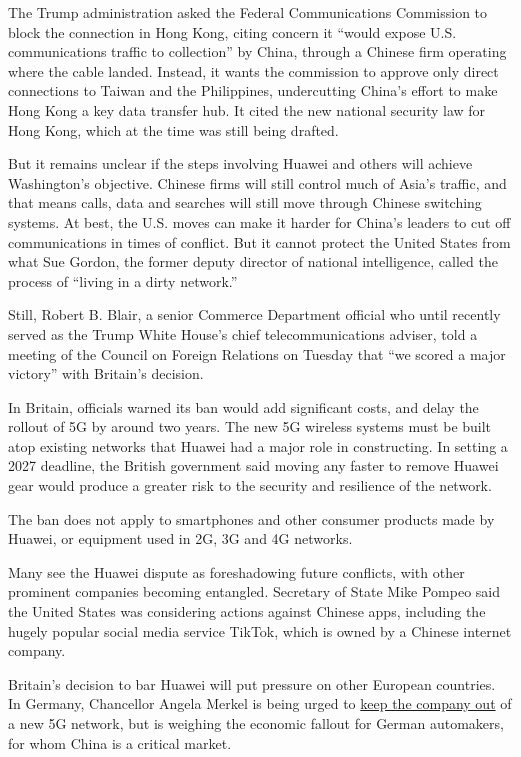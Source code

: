 The Trump administration asked the Federal Communications Commission to
block the connection in Hong Kong, citing concern it ``would expose U.S.
communications traffic to collection'' by China, through a Chinese firm
operating where the cable landed. Instead, it wants the commission to
approve only direct connections to Taiwan and the Philippines,
undercutting China's effort to make Hong Kong a key data transfer hub.
It cited the new national security law for Hong Kong, which at the time
was still being drafted.

But it remains unclear if the steps involving Huawei and others will
achieve Washington's objective. Chinese firms will still control much of
Asia's traffic, and that means calls, data and searches will still move
through Chinese switching systems. At best, the U.S. moves can make it
harder for China's leaders to cut off communications in times of
conflict. But it cannot protect the United States from what Sue Gordon,
the former deputy director of national intelligence, called the process
of ``living in a dirty network.''

Still, Robert B. Blair, a senior Commerce Department official who until
recently served as the Trump White House's chief telecommunications
adviser, told a meeting of the Council on Foreign Relations on Tuesday
that ``we scored a major victory'' with Britain's decision.

In Britain, officials warned its ban would add significant costs, and
delay the rollout of 5G by around two years. The new 5G wireless systems
must be built atop existing networks that Huawei had a major role in
constructing. In setting a 2027 deadline, the British government said
moving any faster to remove Huawei gear would produce a greater risk to
the security and resilience of the network.

The ban does not apply to smartphones and other consumer products made
by Huawei, or equipment used in 2G, 3G and 4G networks.

Many see the Huawei dispute as foreshadowing future conflicts, with
other prominent companies becoming entangled. Secretary of State Mike
Pompeo said the United States was considering actions against Chinese
apps, including the hugely popular social media service TikTok, which is
owned by a Chinese internet company.

Britain's decision to bar Huawei will put pressure on other European
countries. In Germany, Chancellor Angela Merkel is being urged to
\href{https://www.nytimes.com/2020/01/16/world/europe/huawei-germany-china-5g-automakers.html}{keep
the company out} of a new 5G network, but is weighing the economic
fallout for German automakers, for whom China is a critical market.

